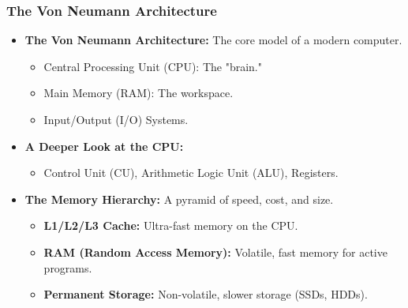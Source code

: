 \begin{frame}  
    \frametitle{The Von Neumann Architecture}
\begin{itemize}
    \item \textbf{The Von Neumann Architecture:} The core model of a modern computer.
    \begin{itemize}
        \item Central Processing Unit (CPU): The "brain."
        \item Main Memory (RAM): The workspace.
        \item Input/Output (I/O) Systems.
    \end{itemize}
    \item \textbf{A Deeper Look at the CPU:}
    \begin{itemize}
        \item Control Unit (CU), Arithmetic Logic Unit (ALU), Registers.
    \end{itemize}
    \item \textbf{The Memory Hierarchy:} A pyramid of speed, cost, and size.
    \begin{itemize}
        \item \textbf{L1/L2/L3 Cache:} Ultra-fast memory on the CPU.
        \item \textbf{RAM (Random Access Memory):} Volatile, fast memory for active programs.
        \item \textbf{Permanent Storage:} Non-volatile, slower storage (SSDs, HDDs).
    \end{itemize}
\end{itemize}
\end{frame}  

